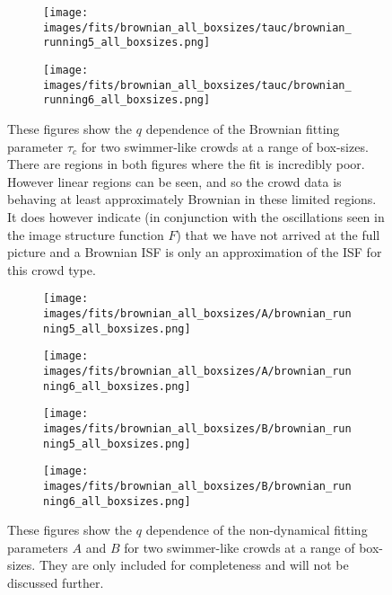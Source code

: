 \documentclass[10pt]{article}
\begin{document}
\begin{figure}[H]
\begin{subfigure}[t]{.5\textwidth}
  \centering
 \texttt{[image: images/fits/brownian\_all\_boxsizes/tauc/brownian\_running5\_all\_boxsizes.png]}
  \caption{}
\end{subfigure}%
\hfill
\begin{subfigure}[t]{.5\textwidth}
  \centering
  \texttt{[image: images/fits/brownian\_all\_boxsizes/tauc/brownian\_running6\_all\_boxsizes.png]}
  \caption{}
\end{subfigure}
\caption{These figures show the $q$ dependence of the Brownian fitting parameter $\tau_c$ for two swimmer-like crowds at a range of box-sizes. There are regions in both figures where the fit is incredibly poor. However linear regions can be seen, and so the crowd data is behaving at least approximately Brownian in these limited regions. It does however indicate (in conjunction with the oscillations seen in the image structure function $F$) that we have not arrived at the full picture and a Brownian ISF is only an approximation of the ISF for this crowd type.}
\label{fig:running_brownian_fits_tauc_all_boxsizes}
\end{figure}

\begin{figure}[H]
\begin{subfigure}[t]{.5\textwidth}
  \centering
 \texttt{[image: images/fits/brownian\_all\_boxsizes/A/brownian\_running5\_all\_boxsizes.png]}
  \caption{}
\end{subfigure}%
\hfill
\begin{subfigure}[t]{.5\textwidth}
  \centering
  \texttt{[image: images/fits/brownian\_all\_boxsizes/A/brownian\_running6\_all\_boxsizes.png]}
  \caption{}
\end{subfigure}
\label{fig:running_brownian_fits_A_all_boxsizes}
\par\bigskip
\begin{subfigure}[t]{.5\textwidth}
  \centering
 \texttt{[image: images/fits/brownian\_all\_boxsizes/B/brownian\_running5\_all\_boxsizes.png]}
  \caption{}
\end{subfigure}%
\hfill
\begin{subfigure}[t]{.5\textwidth}
  \centering
  \texttt{[image: images/fits/brownian\_all\_boxsizes/B/brownian\_running6\_all\_boxsizes.png]}
  \caption{}
\end{subfigure}
\caption{These figures show the $q$ dependence of the non-dynamical fitting parameters $A$ and $B$ for two swimmer-like crowds at a range of box-sizes. They are only included for completeness and will not be discussed further.}
\label{fig:running_brownian_fits_tauc_B_boxsizes}
\end{figure}
\clearpage
\end{document}
